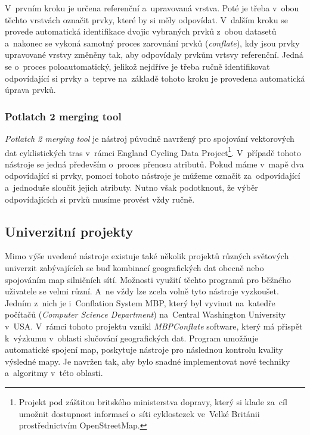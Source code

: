 V~prvním kroku je určena referenční a~upravovaná vrstva. Poté je třeba v~obou
těchto vrstvách označit prvky, které by si měly odpovídat. V~dalším kroku se 
provede automatická identifikace dvojic vybraných prvků z~obou datasetů 
a~nakonec se vykoná samotný proces zarovnání prvků (\textit{conflate}), kdy 
jsou prvky upravované vrstvy změněny tak, aby odpovídaly prvkům vrtsvy 
referenční. Jedná se o~proces poloautomatický, jelikož nejdříve je třeba
ručně identifikovat odpovídající si prvky a~teprve na~základě tohoto kroku je 
provedena automatická úprava prvků.

\subsubsection{Potlatch 2 merging tool}

\textit{Potlatch 2 merging tool} je nástroj původně navržený pro spojování 
vektorových dat cyklistických tras v~rámci England Cycling Data 
Project\footnote{Projekt pod záštitou britského ministerstva dopravy, 
který si klade za~cíl umožnit dostupnost informací o~síti cyklostezek
ve~Velké Británii prostřednictvím OpenStreetMap.}. %
V~případě tohoto nástroje se jedná především o~proces přenosu atributů. 
Pokud máme v~mapě dva odpovídající si prvky, pomocí tohoto nástroje je 
můžeme označit za~odpovídající a~jednoduše sloučit jejich atributy. Nutno 
však podotknout, že výběr odpovídajících si prvků musíme provést vždy ručně. 


\subsection{Univerzitní projekty}
\label{univerzitní}

Mimo výše uvedené nástroje existuje také několik projektů různých světových
univerzit zabývajících se buď kombinací geo\-grafických dat obecně nebo 
spojováním map silničních sítí. Možnosti využití těchto programů pro běžného
uživatele se velmi různí. A~ne vždy lze zcela volně tyto nástroje vyzkoušet. 
Jedním z~nich je i~Conflation System MBP, který byl vyvinut na~katedře počítačů 
(\textit{Computer Science Department}) na~Central Washington University v~USA. 
V~rámci tohoto projektu vznikl \textit{MBPConflate} software, který má přispět 
k~výzkumu v~oblasti slučování geo\-grafických dat. Program umožňuje automatické 
spojení map, poskytuje nástroje pro následnou kontrolu kvali\-ty výsledné mapy. 
Je navržen tak, aby bylo snadné implementovat nové techniky a~algoritmy v~této 
oblasti.  

